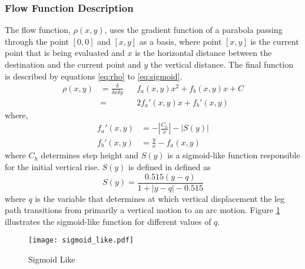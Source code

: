             \subsubsection{Flow Function Description} \label{sec:flow_function}
                The flow function, \(\rho(x,y)\), uses the gradient function of a parabola passing through the point \([0,0]\) and \([x,y]\) as a basis, where point \([x,y]\)
                is the current point that is being evaluated and \(x\) is the horizontal distance between the destination and the current point and \(y\) the
                vertical distance. The final function is described by equations \ref{eq:rho} to \ref{eq:sigmoid}.
                \begin{equation} \label{eq:rho}
                    \begin{aligned}
                        \rho(x,y) &= \frac{\delta}{\delta x\delta y}&&f_a(x,y)x^2 + f_b(x,y)x + C\\
                        &= &&2f_a'(x,y)x + f_b'(x,y)    
                    \end{aligned}
                \end{equation}
                where, %
                \begin{align} \label{eq:fa}
                    f_a'(x,y) &= -\left|\frac{C_h}{x}\right| - \left|S(y)\right|\\
                    f_b'(x,y) &= \frac{y}{x} - f_a(x,y)
                \end{align}
                where \(C_h\) determines step height and \(S(y)\) is a sigmoid-like function responsible for the initial vertical rise. \(S(y)\) is defined in defined as
                \begin{equation} \label{eq:sigmoid}
                    S(y) = \frac{0.515(y-q)}{1+\left|y-q\right|-0.515}
                \end{equation}
                where \(q\) is the variable that determines at which vertical displacement the leg path transitions from primarily a vertical motion to an arc motion. Figure \ref{fig:sigmoid_like} illustrates the sigmoid-like function for different values of \(q\).
                \begin{figure}[h]
                    \centering
                    \hspace{-1.38cm}
                    \texttt{[image: sigmoid\_like.pdf]}
                    \caption{Sigmoid Like}
                    \label{fig:sigmoid_like}
                \end{figure}

